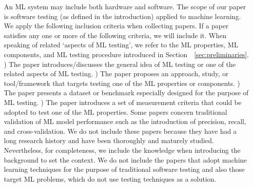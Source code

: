 \label{sec:surveyscope}
An ML system may include both hardware and software. 
The scope of our paper is software testing (as defined in the introduction) applied to machine learning.
We apply the following inclusion criteria when collecting papers.
If a paper satisfies any one or more of the following criteria, we will include it.
When speaking of related `aspects of ML testing', we refer to the ML properties, ML components, and ML testing procedure introduced in Section~~\ref{sec:preliminaries}.
) The paper introduces/discusses the general idea of ML testing or one of the related aspects of ML testing.
) The paper proposes an approach, study, or tool/framework that targets testing one of the ML properties or components.
) The paper presents a dataset or benchmark especially designed for the purpose of ML testing.
) The paper introduces a set of measurement criteria that could be adopted to test one of the ML properties.
Some papers concern traditional validation of ML model performance such as the introduction of precision, recall, and cross-validation.
We do not include these papers because they have had a long research history and have been thoroughly and maturely studied.
Nevertheless, for completeness, we include the knowledge when introducing the background to set the context.
We do not include the papers that adopt machine learning techniques for the purpose of traditional software testing and also those target ML problems, which do not use testing techniques as a solution. 

